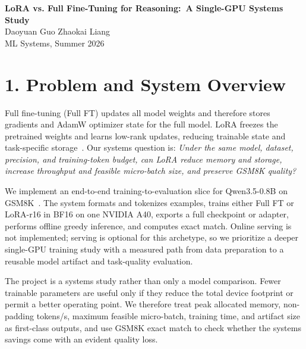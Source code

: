 \documentclass[10pt]{article}
\newcommand{\sysquestion}{Under the same model, dataset, precision, and training-token budget, can LoRA reduce memory and storage, increase throughput and feasible micro-batch size, and preserve GSM8K quality?}
\begin{document}
\small

\begin{center}
{\Large\bfseries LoRA vs. Full Fine-Tuning for Reasoning:\ A Single-GPU Systems Study}\\[1mm]
{\normalsize Daoyuan Guo \qquad Zhaokai Liang}\\[-1mm]
{\footnotesize ML Systems, Summer 2026}
\end{center}
\vspace{-2mm}

\section*{1. Problem and System Overview}

Full fine-tuning (Full FT) updates all model weights and therefore stores gradients and AdamW optimizer state for the full model. LoRA freezes the pretrained weights and learns low-rank updates, reducing trainable state and task-specific storage~\cite{hu2022lora}. Our systems question is: \emph{\sysquestion}

We implement an end-to-end training-to-evaluation slice for Qwen3.5-0.8B on GSM8K~\cite{cobbe2021gsm8k}. The system formats and tokenizes examples, trains either Full FT or LoRA-r16 in BF16 on one NVIDIA A40, exports a full checkpoint or adapter, performs offline greedy inference, and computes exact match. Online serving is not implemented; serving is optional for this archetype, so we prioritize a deeper single-GPU training study with a measured path from data preparation to a reusable model artifact and task-quality evaluation.

The project is a systems study rather than only a model comparison. Fewer trainable parameters are useful only if they reduce the total device footprint or permit a better operating point. We therefore treat peak allocated memory, non-padding tokens/s, maximum feasible micro-batch, training time, and artifact size as first-class outputs, and use GSM8K exact match to check whether the systems savings come with an evident quality loss.
\end{document}
